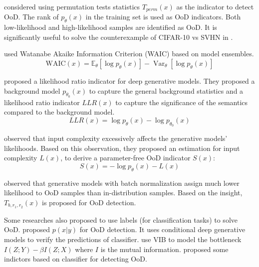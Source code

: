 \documentclass[letterpaper]{article} %
\begin{document}
\cite{song2017pixeldefend} considered using permutation tests statistics $T_{perm}(x)$ as the indicator to detect OoD. The rank of $p_\theta(x)$ in the training set is used as OoD indicators. Both low-likelihood and high-likelihood samples are identified as OoD. It is significantly useful to solve the counterexample of CIFAR-10 vs SVHN in \cite{nalisnick2019do}. 

\cite{choi2018waic} used Watanabe Akaike Information Criterion (WAIC) based on model ensembles.
\begin{equation}
	\text{WAIC}(x) = \mathbb{E}_{\theta} [\log p_\theta(x)] - \operatorname{Var}_{\theta} [\log p_\theta(x)]
\end{equation}

\cite{ren2019likelihood} proposed a likelihood ratio indicator for deep generative models. They proposed a background model $p_{\theta_0}(x)$ to capture the general background statistics and a likelihood ratio indicator $LLR(x)$ to capture the significance of the semantics compared to the background model. 
\begin{equation}
LLR(x) = \log p_\theta(x) - \log p_{\theta_0}(x)
\end{equation}

\cite{serra2019input} observed that input complexity excessively affects the generative models' likelihoods. Based on this observation, they proposed an estimation for input complexity $L(x)$, to derive a parameter-free OoD indicator $S(x)$:
\begin{equation}
	S(x) = -\log p_\theta(x) - L(x)
\end{equation}

\cite{song2019unsupervised} observed that generative models with batch normalization assign much lower likelihood to OoD samples than in-distribution samples. 
Based on the insight, $T_{b, r_1, r_2}(x)$ is proposed for OoD detection. 

Some researches also proposed to use labels (for classification tasks) to solve OoD. 
\cite{che2019deep} proposed $p(x|y)$ for OoD detection. It uses conditional deep generative models to verify the predictions of classifier. \cite{alemi2018uncertainty} use VIB to model the bottleneck $I(Z;Y)-\beta I(Z;X)$ where $I$ is the mutual information. 
\cite{hendrycks2016baseline,hendrycks2018deep,hsu2020generalized,lee2018simple,lakshminarayanan2017simple} proposed some indictors based on classifier for detecting OoD. 
\end{document}
